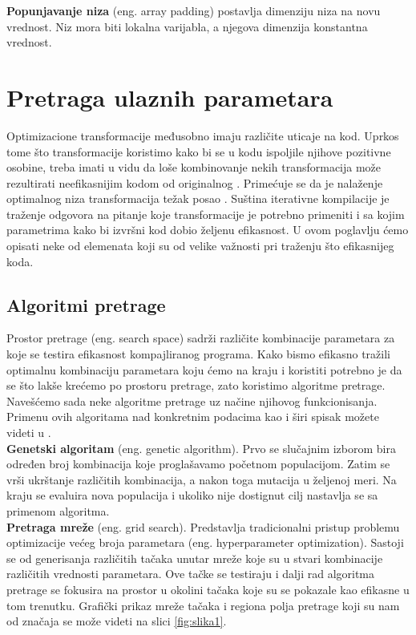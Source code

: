 \documentclass[a4paper]{article}
\begin{document}
\textbf{Popunjavanje niza} (eng. array padding) postavlja dimenziju niza na novu vrednost. Niz mora biti lokalna varijabla, a njegova dimenzija konstantna vrednost.

\section{Pretraga ulaznih parametara}
\label{sec:pretraga}
Optimizacione transformacije međusobno imaju različite uticaje na kod. 
Uprkos tome što transformacije koristimo kako bi se u kodu ispoljile njihove pozitivne osobine, 
treba imati u vidu da loše kombinovanje nekih transformacija može rezultirati neefikasnijim kodom od originalnog \cite{Knijnenburg2002}. 
Primećuje se da je nalaženje optimalnog niza transformacija težak posao \cite{Fursin2005}. Suština iterativne kompilacije
je traženje odgovora na pitanje koje transformacije je potrebno primeniti i sa kojim parametrima kako bi 
izvršni kod dobio željenu efikasnost. U ovom poglavlju ćemo opisati neke od elemenata koji su od velike važnosti pri traženju što efikasnijeg koda.
\subsection{Algoritmi pretrage}
\label{sec:pretrage}

Prostor pretrage (eng. search space) sadrži različite kombinacije parametara za koje se testira efikasnost kompajliranog 
programa. Kako bismo efikasno tražili optimalnu kombinaciju parametara koju ćemo na kraju i koristiti potrebno je da se što 
lakše krećemo po prostoru pretrage, zato koristimo algoritme pretrage. 
Navešćemo sada neke algoritme pretrage uz načine njihovog funkcionisanja. 
Primenu ovih algoritama nad konkretnim podacima kao i širi spisak možete videti u \cite{kisuki2000iterative}. \\

\textbf{Genetski algoritam} (eng. genetic algorithm). Prvo se slučajnim izborom bira određen broj kombinacija koje proglašavamo početnom populacijom. Zatim se vrši ukrštanje različitih kombinacija, a nakon toga mutacija u željenoj meri. Na kraju se evaluira nova populacija i ukoliko nije dostignut cilj nastavlja se sa primenom algoritma.\\

\textbf{Pretraga mreže} (eng. grid search). Predstavlja tradicionalni pristup problemu optimizacije većeg broja parametara (eng. hyperparameter optimization). 
Sastoji se od generisanja različitih tačaka unutar mreže koje su u stvari kombinacije različitih vrednosti parametara. 
Ove tačke se testiraju i dalji rad algoritma pretrage se fokusira na prostor u okolini tačaka koje su se pokazale kao efikasne u tom trenutku. Grafički prikaz mreže tačaka i regiona polja pretrage koji su nam od značaja se može videti na slici \ref{fig:slika1}.\\
\end{document}
